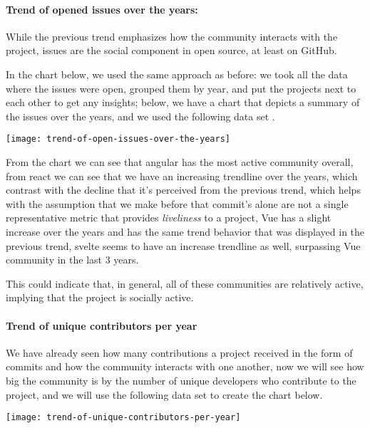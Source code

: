 \pagebreak

\paragraph{Trend of opened issues over the years: }
While the previous trend emphasizes how the community interacts with the project, issues are the social component in open source, at least on GitHub.

In the chart below, we used the same approach as before: we took all the data where the issues were open, grouped them by year, and put the projects next to each other to get any insights; below, we have a chart that depicts a summary of the issues over the years, and we used the following data set \cite{trend-of-open-issues-over-the-years}.

\begin{center}
    \texttt{[image: trend-of-open-issues-over-the-years]}    
\end{center}

From the chart we can see that angular has the most active community overall, from react we can see that we have an increasing trendline over the years, which contrast with the decline that it's perceived from the previous trend, which helps with the assumption that we make before that commit's alone are not a single representative metric that provides \textit{liveliness} to a project, Vue has a slight increase over the years and has the same trend behavior that was displayed in the previous trend, svelte seems to have an increase trendline as well, surpassing Vue community in the last 3 years.

This could indicate that, in general, all of these communities are relatively active, implying that the project is socially active.

\newpage

\paragraph{Trend of unique contributors per year}
We have already seen how many contributions a project received in the form of commits and how the community interacts with one another, now we will see how big the community is by the number of unique developers who contribute to the project, and we will use the following data set \cite{trend-of-unique-contributors-per-year} to create the chart below.

\begin{center}
    \texttt{[image: trend-of-unique-contributors-per-year]}    
\end{center}

